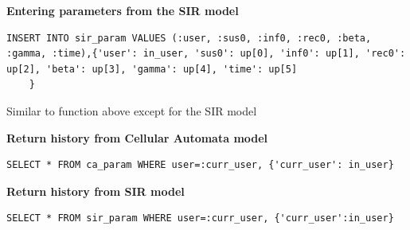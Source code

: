 \documentclass[11pt, a4paper]{article}
\begin{document}
\textbf{Entering parameters from the SIR model}
\begin{lstlisting}
INSERT INTO sir_param VALUES (:user, :sus0, :inf0, :rec0, :beta, :gamma, :time),{'user': in_user, 'sus0': up[0], 'inf0': up[1], 'rec0': up[2], 'beta': up[3], 'gamma': up[4], 'time': up[5]
    }
\end{lstlisting}
Similar to function above except for the SIR model

\textbf{Return history from Cellular Automata model}
\begin{lstlisting}
SELECT * FROM ca_param WHERE user=:curr_user, {'curr_user': in_user}
\end{lstlisting}

\textbf{Return history from SIR model}
\begin{lstlisting}
SELECT * FROM sir_param WHERE user=:curr_user, {'curr_user':in_user}
\end{lstlisting}
\end{document}
